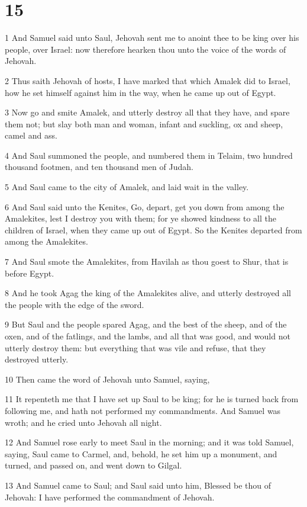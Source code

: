 \chapter{15}

\par 1 And Samuel said unto Saul, Jehovah sent me to anoint thee to be king over his people, over Israel: now therefore hearken thou unto the voice of the words of Jehovah.
\par 2 Thus saith Jehovah of hosts, I have marked that which Amalek did to Israel, how he set himself against him in the way, when he came up out of Egypt.
\par 3 Now go and smite Amalek, and utterly destroy all that they have, and spare them not; but slay both man and woman, infant and suckling, ox and sheep, camel and ass.
\par 4 And Saul summoned the people, and numbered them in Telaim, two hundred thousand footmen, and ten thousand men of Judah.
\par 5 And Saul came to the city of Amalek, and laid wait in the valley.
\par 6 And Saul said unto the Kenites, Go, depart, get you down from among the Amalekites, lest I destroy you with them; for ye showed kindness to all the children of Israel, when they came up out of Egypt. So the Kenites departed from among the Amalekites.
\par 7 And Saul smote the Amalekites, from Havilah as thou goest to Shur, that is before Egypt.
\par 8 And he took Agag the king of the Amalekites alive, and utterly destroyed all the people with the edge of the sword.
\par 9 But Saul and the people spared Agag, and the best of the sheep, and of the oxen, and of the fatlings, and the lambs, and all that was good, and would not utterly destroy them: but everything that was vile and refuse, that they destroyed utterly.
\par 10 Then came the word of Jehovah unto Samuel, saying,
\par 11 It repenteth me that I have set up Saul to be king; for he is turned back from following me, and hath not performed my commandments. And Samuel was wroth; and he cried unto Jehovah all night.
\par 12 And Samuel rose early to meet Saul in the morning; and it was told Samuel, saying, Saul came to Carmel, and, behold, he set him up a monument, and turned, and passed on, and went down to Gilgal.
\par 13 And Samuel came to Saul; and Saul said unto him, Blessed be thou of Jehovah: I have performed the commandment of Jehovah.
